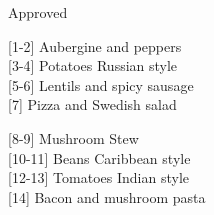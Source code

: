 		\begin{menu}{Approved}
    
    \begin{recipelist}
    
        {\scriptsize[1-2]} Aubergine and peppers\\
        {\scriptsize[3-4]} Potatoes Russian style\\
        {\scriptsize[5-6]} Lentils and spicy sausage\\
        {\scriptsize[7]} Pizza and Swedish salad\\%
    \end{recipelist}%
    \begin{recipelist}
    
        {\scriptsize[8-9]} Mushroom Stew\\
        {\scriptsize[10-11]} Beans Caribbean style\\
        {\scriptsize[12-13]} Tomatoes Indian style\\
        {\scriptsize[14]} Bacon and mushroom pasta\\%
    \end{recipelist}\par%
  

\end{menu}
